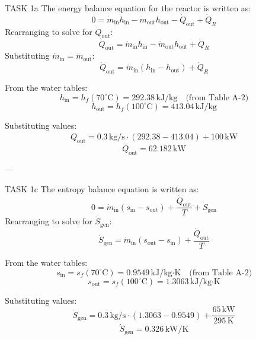 TASK 1a  
The energy balance equation for the reactor is written as:  
\[
0 = \dot{m}_{\text{in}} h_{\text{in}} - \dot{m}_{\text{out}} h_{\text{out}} - \dot{Q}_{\text{out}} + \dot{Q}_R
\]  
Rearranging to solve for \( \dot{Q}_{\text{out}} \):  
\[
\dot{Q}_{\text{out}} = \dot{m}_{\text{in}} h_{\text{in}} - \dot{m}_{\text{out}} h_{\text{out}} + \dot{Q}_R
\]  
Substituting \( \dot{m}_{\text{in}} = \dot{m}_{\text{out}} \):  
\[
\dot{Q}_{\text{out}} = \dot{m}_{\text{in}} \left( h_{\text{in}} - h_{\text{out}} \right) + \dot{Q}_R
\]  

From the water tables:  
\[
h_{\text{in}} = h_f(70^\circ\text{C}) = 292.38 \, \text{kJ/kg} \quad \text{(from Table A-2)}
\]  
\[
h_{\text{out}} = h_f(100^\circ\text{C}) = 413.04 \, \text{kJ/kg}
\]  

Substituting values:  
\[
\dot{Q}_{\text{out}} = 0.3 \, \text{kg/s} \cdot \left( 292.38 - 413.04 \right) + 100 \, \text{kW}
\]  
\[
\dot{Q}_{\text{out}} = 62.182 \, \text{kW}
\]  

---

TASK 1c  
The entropy balance equation is written as:  
\[
0 = \dot{m}_{\text{in}} \left( s_{\text{in}} - s_{\text{out}} \right) + \frac{\dot{Q}_{\text{out}}}{T} + \dot{S}_{\text{gen}}
\]  
Rearranging to solve for \( \dot{S}_{\text{gen}} \):  
\[
\dot{S}_{\text{gen}} = \dot{m}_{\text{in}} \left( s_{\text{out}} - s_{\text{in}} \right) + \frac{\dot{Q}_{\text{out}}}{T}
\]  

From the water tables:  
\[
s_{\text{in}} = s_f(70^\circ\text{C}) = 0.9549 \, \text{kJ/kg·K} \quad \text{(from Table A-2)}
\]  
\[
s_{\text{out}} = s_f(100^\circ\text{C}) = 1.3063 \, \text{kJ/kg·K}
\]  

Substituting values:  
\[
\dot{S}_{\text{gen}} = 0.3 \, \text{kg/s} \cdot \left( 1.3063 - 0.9549 \right) + \frac{65 \, \text{kW}}{295 \, \text{K}}
\]  
\[
\dot{S}_{\text{gen}} = 0.326 \, \text{kW/K}
\]  